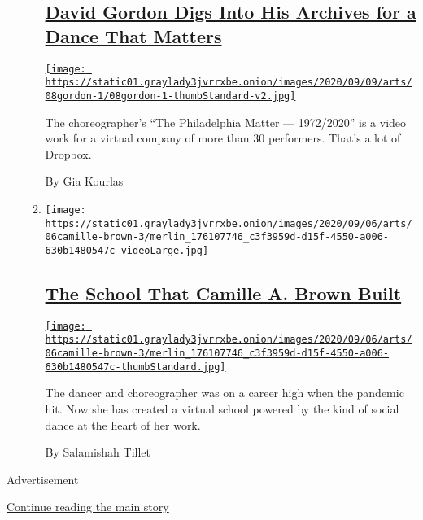 \begin{enumerate}
\begin{enumerate}
    \hypertarget{david-gordon-digs-into-his-archives-for-a-dance-that-matters}{%
    \subsection{\texorpdfstring{\href{/2020/09/08/arts/dance/david-gordon-philadelphia-matters.html}{David
    Gordon Digs Into His Archives for a Dance That
    Matters}}{David Gordon Digs Into His Archives for a Dance That Matters}}\label{david-gordon-digs-into-his-archives-for-a-dance-that-matters}}

    \href{/2020/09/08/arts/dance/david-gordon-philadelphia-matters.html}{\texttt{[image: https://static01.graylady3jvrrxbe.onion/images/2020/09/09/arts/08gordon-1/08gordon-1-thumbStandard-v2.jpg]}}

    The choreographer's ``The Philadelphia Matter --- 1972/2020'' is a
    video work for a virtual company of more than 30 performers. That's
    a lot of Dropbox.

    By Gia Kourlas
  \item
    \texttt{[image: https://static01.graylady3jvrrxbe.onion/images/2020/09/06/arts/06camille-brown-3/merlin\_176107746\_c3f3959d-d15f-4550-a006-630b1480547c-videoLarge.jpg]}

    \hypertarget{the-school-that-camille-a-brown-built}{%
    \subsection{\texorpdfstring{\href{/2020/09/02/arts/dance/camille-a-brown-pandemic-every-body-move.html}{The
    School That Camille A. Brown
    Built}}{The School That Camille A. Brown Built}}\label{the-school-that-camille-a-brown-built}}

    \href{/2020/09/02/arts/dance/camille-a-brown-pandemic-every-body-move.html}{\texttt{[image: https://static01.graylady3jvrrxbe.onion/images/2020/09/06/arts/06camille-brown-3/merlin\_176107746\_c3f3959d-d15f-4550-a006-630b1480547c-thumbStandard.jpg]}}

    The dancer and choreographer was on a career high when the pandemic
    hit. Now she has created a virtual school powered by the kind of
    social dance at the heart of her work.

    By Salamishah Tillet
  \end{enumerate}
\end{enumerate}

Advertisement

\protect\hyperlink{after-mid1}{Continue reading the main story}

